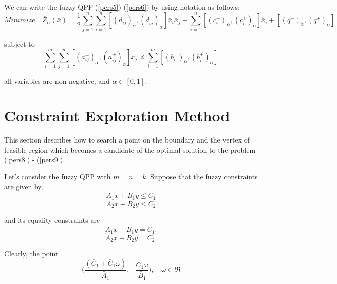 \documentclass{iaesarticle3}
\begin{document}
We can write the fuzzy QPP (\ref{pers5})-(\ref{pers6}) by using notation \cite{kau} as follows:
\begin{equation}\label{pers8}
    Minimize \quad \bar{Z}_\alpha(\bar{x}) = \frac{1}{2} \sum_{j=1}^n \sum_{i=1}^n [(d_{ij}^-)_\alpha,  (d_{ij}^+)_\alpha]\bar{x}_i \bar{x}_j + \sum_{i=1}^n [(c_i^-)_\alpha, (c_i^+)_\alpha] \bar{x}_i + [(q^-)_\alpha, (q^+)_\alpha]
\end{equation}

\noindent subject to
\begin{equation}\label{pers9}
    \sum_{i=1}^m \sum_{j=1}^n [(a_{ij}^-)_\alpha, (a_{ij}^+)_\alpha] \bar{x}_j \preceq \sum_{i=1}^m [(b_i^-)_\alpha, (b_i^+)_\alpha]
\end{equation}

\noindent all variables are non-negative, and $\alpha \in [0,1]$.

\section{Constraint Exploration Method}

This section describes how to search a point on the boundary and the vertex of feasible region which becomes a candidate of the optimal solution to the problem (\ref{pers8}) - (\ref{pers9}).

Let's consider the fuzzy QPP with $m = n = k$. Suppose that the fuzzy constraints are given by,\\

\begin{equation}\label{pers10}
    \bar{A}_1\bar{x} + \bar{B}_1\bar{y} \leq \bar{C}_1
\end{equation}
\begin{equation}\label{pers11}
    \bar{A}_2\bar{x} + \bar{B}_2\bar{y} \leq \bar{C}_2
\end{equation}

\noindent and its equality constraints are \\
\begin{equation}\label{pers12}
    \bar{A}_1\bar{x} + \bar{B}_1\bar{y} = \bar{C}_1.
\end{equation}
\begin{equation}\label{pers13}
    \bar{A}_2\bar{x} + \bar{B}_2\bar{y} = \bar{C}_2.
\end{equation}

Clearly, the point
\begin{equation}\label{pers14}
    \bigg(\frac{(\bar{C}_1 + \bar{C}_1\omega)}{\bar{A}_1},-\frac{\bar{C}_1\omega}{\bar{B}_1}\bigg), \quad \omega \in \Re
\end{equation}
\end{document}
